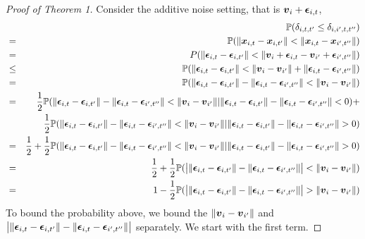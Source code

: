 \documentclass{article}
\begin{document}
% 
% 
% 
% 
% 
% 
% 
% 



\appendix
\begin{proof}[Proof of Theorem 1]
	Consider the additive noise setting, that is $\boldsymbol{v}_{i} + \boldsymbol{\epsilon}_{i,t}$,  
	\begin{eqnarray*}
		& &\PP(\delta_{i,t,t'} \leq \delta_{i,i',t,t''}) \\
		&=&\PP(\|\bx_{i,t}-\bx_{i,t'}\|<\|\bx_{i,t}-\bx_{i',t''}\|) \\
		&=&P(\|\mb{\epsilon}_{i,t}-\mb{\epsilon}_{i,t'}\| < \|\bv_{i}+\mb{\epsilon}_{i,t}-\bv_{i'}+\mb{\epsilon}_{i',t''}\|) \\
		&\leq&\PP(\|\mb{\epsilon}_{i,t}-\mb{\epsilon}_{i,t'}\| < \|\bv_{i}-\bv_{i'}\| + \|\mb{\epsilon}_{i,t}-\mb{\epsilon}_{i',t''}\|) \\
		&=& \PP(\|\mb{\epsilon}_{i,t}-\mb{\epsilon}_{i,t'}\|-\|\mb{\epsilon}_{i,t}-\mb{\epsilon}_{i',t''}\|< \|\bv_{i}-\bv_{i'}\|) \\
		&=& \frac{1}{2}\PP(\|\mb{\epsilon}_{i,t}-\mb{\epsilon}_{i,t'}\|-\|\mb{\epsilon}_{i,t}-\mb{\epsilon}_{i',t''}\|< \|\bv_{i}-\bv_{i'}\||\|\mb{\epsilon}_{i,t}-\mb{\epsilon}_{i,t'}\|-\|\mb{\epsilon}_{i,t}-\mb{\epsilon}_{i',t''}\|<0) + \\ 
		& &\frac{1}{2}\PP(\|\mb{\epsilon}_{i,t}-\mb{\epsilon}_{i,t'}\|-\|\mb{\epsilon}_{i,t}-\mb{\epsilon}_{i',t''}\|< \|\bv_{i}-\bv_{i'}\||\|\mb{\epsilon}_{i,t}-\mb{\epsilon}_{i,t'}\|-\|\mb{\epsilon}_{i,t}-\mb{\epsilon}_{i',t''}\|>0) \\
		&=&\frac{1}{2} + \frac{1}{2}\PP(\|\mb{\epsilon}_{i,t}-\mb{\epsilon}_{i,t'}\|-\|\mb{\epsilon}_{i,t}-\mb{\epsilon}_{i',t''}\|< \|\bv_{i}-\bv_{i'}\||\|\mb{\epsilon}_{i,t}-\mb{\epsilon}_{i,t'}\|-\|\mb{\epsilon}_{i,t}-\mb{\epsilon}_{i',t''}\|>0) \\
		&=& \frac{1}{2} + \frac{1}{2}\PP(\big| \|\mb{\epsilon}_{i,t}-\mb{\epsilon}_{i,t'}\|-\|\mb{\epsilon}_{i,t}-\mb{\epsilon}_{i',t''}\| \big|< \|\bv_{i}-\bv_{i'}\|)\\
		&=& 1 - \frac{1}{2} \PP(\big| \|\mb{\epsilon}_{i,t}-\mb{\epsilon}_{i,t'}\|-\|\mb{\epsilon}_{i,t}-\mb{\epsilon}_{i',t''}\| \big|> \|\bv_{i}-\bv_{i'}\|)\\
	\end{eqnarray*}
	To bound the probability above, we bound the $\|\boldsymbol{v}_{i}-\boldsymbol{v}_{i'}\|$ and $\big| \|\boldsymbol{\epsilon}_{i,t}-\boldsymbol{\epsilon}_{i,t'}\|-\|\boldsymbol{\epsilon}_{i,t}-\boldsymbol{\epsilon}_{i',t''}\| \big|$ separately. We start with the first term.

\end{proof}
\end{document}

